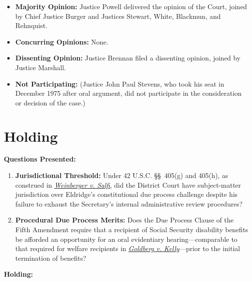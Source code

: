 \documentclass[12pt]{article}
\begin{document}
\begin{itemize}
    \item \textbf{Majority Opinion:} Justice Powell delivered the opinion of the Court, joined by Chief Justice Burger and Justices Stewart, White, Blackmun, and Rehnquist.
    \item \textbf{Concurring Opinions:} None.
    \item \textbf{Dissenting Opinion:} Justice Brennan filed a dissenting opinion, joined by Justice Marshall.
    \item \textbf{Not Participating:} (Justice John Paul Stevens, who took his seat in December 1975 after oral argument, did not participate in the consideration or decision of the case.)

\end{itemize}

\section{Holding}
\textbf{Questions Presented:}

\begin{enumerate}
    \item \textbf{Jurisdictional Threshold:} Under 42 U.S.C. \S\S~405(g) and 405(h), as construed in \href{https://supreme.justia.com/cases/federal/us/422/749/}{\emph{Weinberger v. Salfi}}, did the District Court have subject-matter jurisdiction over Eldridge's constitutional due process challenge despite his failure to exhaust the Secretary's internal administrative review procedures?
    \item \textbf{Procedural Due Process Merits:} Does the Due Process Clause of the Fifth Amendment require that a recipient of Social Security disability benefits be afforded an opportunity for an oral evidentiary hearing---comparable to that required for welfare recipients in \href{https://supreme.justia.com/cases/federal/us/397/254/}{\emph{Goldberg v. Kelly}}---prior to the initial termination of benefits?
\end{enumerate}

\textbf{Holding:}
\end{document}

